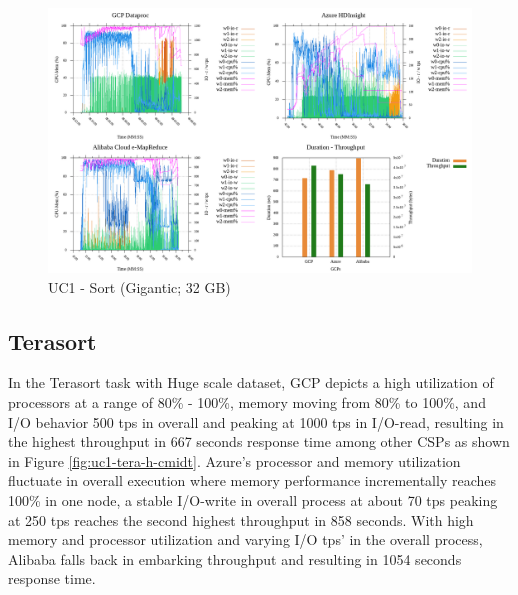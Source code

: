 \documentclass[review]{elsarticle}
\begin{document}
\begin{figure}[p]
	\caption{UC1 - Sort (Gigantic; 32 GB)}
	\label{fig:uc1-srt-g-cmidt}
	\includegraphics[width=\textwidth]{uc1-srt-g-cmidt}
	\centering
\end{figure}

\subsection{Terasort}
In the Terasort task with Huge scale dataset, GCP depicts a high utilization of processors at a range of 80\% - 100\%, memory moving from 80\% to 100\%, and I/O behavior 500 tps in overall and peaking at 1000 tps in I/O-read, resulting in the highest throughput in 667 seconds response time among other CSPs as shown in Figure \ref{fig:uc1-tera-h-cmidt}. Azure's processor and memory utilization fluctuate in overall execution where memory performance incrementally reaches 100\% in one node, a stable I/O-write in overall process at about 70 tps peaking at 250 tps reaches the second highest throughput in 858 seconds. With high memory and processor utilization and varying I/O tps' in the overall process, Alibaba falls back in embarking throughput and resulting in 1054 seconds response time.
\end{document}
